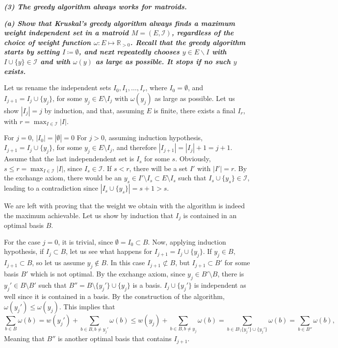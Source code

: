 \textbf{\textit{(3) The greedy algorithm always works for matroids.}}

\hspace{5pt}\textbf{\textit{(a) Show that Kruskal's greedy algorithm always finds a maximum weight independent set in a matroid $M = (E, \mathcal{I})$, regardless of the choice of weight function $\omega : E \mapsto \mathbb{R}_{>0}$. Recall that the greedy algorithm starts by setting $I \coloneqq \emptyset$, and next repeatedly chooses $y \in E \backslash I$ with $I \cup \lbrace y \rbrace \in \mathcal{I}$ and with $\omega(y)$ as large as possible. It stops if no such $y$ exists.}}

\vspace{3pt}

Let us rename the independent sets $I_0, I_1, \ldots, I_r$, where $I_0 = \emptyset$, and $I_{j+1} = I_j \cup \{y_j\}$, for some $y_j \in E \setminus I_j$ with $\omega( y_j)$ as large as possible. Let us show $|I_j| = j$ by induction, and that, assuming $E$ is finite, there exists a final $I_r$, with $r = \max_{I \in \mathcal I} |I|$.

For $j = 0$, $|I_0| = |\emptyset| = 0$
For $j > 0$, assuming induction hypothesis, $I_{j+1} = I_j \cup \{y_j\}$, for some $y_j \in E \setminus I_j$, and therefore $|I_{j+1}| = |I_j| + 1 = j + 1$. Assume that the last independendent set is $I_s$ for some $s$. Obviously, $s \leq r = \max_{I \in \mathcal I} |I|$, since $I_s \in \mathcal I$. If $s < r$, there will be a set $I'$ with $|I'| = r$. By the exchange axiom, there would be an $y_s \in I' \setminus I_s \subset E \setminus I_s$ such that $I_s \cup \{y_s\} \in \mathcal I$, leading to a contradiction since $|I_s \cup \{y_s\}| = s + 1 > s$.

We are left with proving that the weight we obtain with the algorithm is indeed the maximum achievable. Let us show by induction that $I_j$ is contained in an optimal basis $B$.

For the case $j = 0$, it is trivial, since $\emptyset = I_0 \subset B$. Now, applying induction hypothesis, if $I_j \subset B$, let us see what happens for $I_{j+1} = I_j \cup \{y_j\}$. If $y_j \in B$, $I_{j+1} \subset B$, so let us assume $y_j \notin B$. In this case $I_{j+1} \not\subset B$, but $I_{j+1} \subset B'$ for some basis $B'$ which is not optimal. By the exchange axiom, since $y_j \in B' \setminus B$, there is $y_j' \in B \setminus B'$ such that $B'' = B \setminus \{y_j'\} \cup \{y_j\}$ is a basis. $I_j \cup \{y_j'\}$ is independent as well since it is contained in a basis. By the construction of the algorithm, $\omega(y_j') \leq \omega(y_j)$. This implies that
\[
\sum_{b \in B} \omega(b) =
w(y_j') + \sum_{b \in B, b \neq y_j'} \omega(b) \leq
w(y_j) + \sum_{b \in B, b \neq y_j} \omega(b) =
\sum_{b \in B \setminus \{y_j'\} \cup \{y_j'\}} \omega(b) =
\sum_{b \in B''} \omega(b),
\]
Meaning that $B''$ is another optimal basis that contains $I_{j+1}$.

